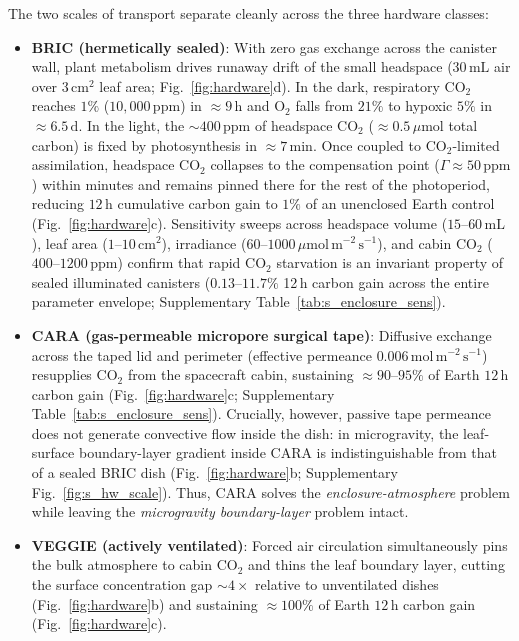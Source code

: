 \documentclass[preprint,11pt,numbers,sort&compress]{elsarticle}
\newcommand{\ums}{\ensuremath{\mu\mathrm{mol\,m^{-2}\,s^{-1}}}}
\newcommand{\molms}{\ensuremath{\mathrm{mol\,m^{-2}\,s^{-1}}}}
\begin{document}
The two scales of transport separate cleanly across the three hardware classes:
\begin{itemize}
    \item \textbf{BRIC (hermetically sealed)}: With zero gas exchange across the canister wall, plant metabolism drives runaway drift of the small headspace ($30\,\mathrm{mL}$ air over $3\,\mathrm{cm^2}$ leaf area; Fig.~\ref{fig:hardware}d). In the dark, respiratory $\mathrm{CO_2}$ reaches $1\%$ ($10{,}000\,\mathrm{ppm}$) in $\approx 9\,\mathrm{h}$ and $\mathrm{O_2}$ falls from $21\%$ to hypoxic $5\%$ in $\approx 6.5\,\mathrm{d}$. In the light, the $\sim 400\,\mathrm{ppm}$ of headspace $\mathrm{CO_2}$ ($\approx 0.5\,\mu\mathrm{mol}$ total carbon) is fixed by photosynthesis in \textbf{$\approx 7\,\mathrm{min}$}. Once coupled to $\mathrm{CO_2}$-limited assimilation, headspace $\mathrm{CO_2}$ collapses to the compensation point ($\Gamma\approx 50\,\mathrm{ppm}$) within minutes and remains pinned there for the rest of the photoperiod, reducing $12\,\mathrm{h}$ cumulative carbon gain to \textbf{$1\%$} of an unenclosed Earth control (Fig.~\ref{fig:hardware}c). Sensitivity sweeps across headspace volume ($15\text{--}60\,\mathrm{mL}$), leaf area ($1\text{--}10\,\mathrm{cm^2}$), irradiance ($60\text{--}1000\,\ums$), and cabin $\mathrm{CO_2}$ ($400\text{--}1200\,\mathrm{ppm}$) confirm that rapid $\mathrm{CO_2}$ starvation is an invariant property of sealed illuminated canisters ($0.13\text{--}11.7\%$ 12\,h carbon gain across the entire parameter envelope; Supplementary Table~\ref{tab:s_enclosure_sens}).
    \item \textbf{CARA (gas-permeable micropore surgical tape)}: Diffusive exchange across the taped lid and perimeter (effective permeance $0.006\,\molms$) resupplies $\mathrm{CO_2}$ from the spacecraft cabin, sustaining \textbf{$\approx 90\text{--}95\%$} of Earth $12\,\mathrm{h}$ carbon gain (Fig.~\ref{fig:hardware}c; Supplementary Table~\ref{tab:s_enclosure_sens}). Crucially, however, passive tape permeance does not generate convective flow inside the dish: in microgravity, the leaf-surface boundary-layer gradient inside CARA is indistinguishable from that of a sealed BRIC dish (Fig.~\ref{fig:hardware}b; Supplementary Fig.~\ref{fig:s_hw_scale}). Thus, CARA solves the \emph{enclosure-atmosphere} problem while leaving the \emph{microgravity boundary-layer} problem intact.
    \item \textbf{VEGGIE (actively ventilated)}: Forced air circulation simultaneously pins the bulk atmosphere to cabin $\mathrm{CO_2}$ and thins the leaf boundary layer, cutting the surface concentration gap $\sim 4\times$ relative to unventilated dishes (Fig.~\ref{fig:hardware}b) and sustaining \textbf{$\approx 100\%$} of Earth $12\,\mathrm{h}$ carbon gain (Fig.~\ref{fig:hardware}c).
\end{itemize}
\end{document}
